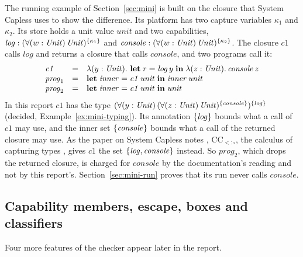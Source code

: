 The running example of Section~\ref{sec:mini} is built on the closure that System Capless uses to show the difference. Its platform has two capture variables $\kappa_1$ and $\kappa_2$. Its store holds a unit value $\mathit{unit}$ and two capabilities, $\mathit{log} : (\forall(w : \mathit{Unit})\,\mathit{Unit})^{\{\kappa_1\}}$ and $\mathit{console} : (\forall(w : \mathit{Unit})\,\mathit{Unit})^{\{\kappa_2\}}$. The closure $\mathit{c1}$ calls $\mathit{log}$ and returns a closure that calls $\mathit{console}$, and two programs call it:
\[
\begin{array}{@{}lcl@{}}
\mathit{c1} & = & \lambda(y : \Unit).\ \klet r = \mathit{log}\,y \kin \lambda(z : \Unit).\,\mathit{console}\,z \\
\mathit{prog}_1 & = & \klet \mathit{inner} = \mathit{c1}\,\mathit{unit} \kin \mathit{inner}\,\mathit{unit} \\
\mathit{prog}_2 & = & \klet \mathit{inner} = \mathit{c1}\,\mathit{unit} \kin \mathit{unit}
\end{array}
\]
In this report $\mathit{c1}$ has the type $(\forall(y : \mathit{Unit})\,(\forall(z : \mathit{Unit})\,\mathit{Unit})^{\{\mathit{console}\}})^{\{\mathit{log}\}}$ (decided, Example~\ref{ex:mini-typing}). Its annotation $\{\mathit{log}\}$ bounds what a call of $\mathit{c1}$ may use, and the inner set $\{\mathit{console}\}$ bounds what a call of the returned closure may use. As the paper on System Capless notes \cite{xu2025box}, $\mathrm{CC}_{<:\square}$, the calculus of capturing types \cite{boruchgruszecki2023capturing}, gives $\mathit{c1}$ the set $\{\mathit{log}, \mathit{console}\}$ instead. So $\mathit{prog}_2$, which drops the returned closure, is charged for $\mathit{console}$ by the documentation's reading and not by this report's. Section~\ref{sec:mini-run} proves that its run never calls $\mathit{console}$.

\subsection{Capability members, escape, boxes and classifiers}\label{sec:cc-later}

Four more features of the checker appear later in the report.


